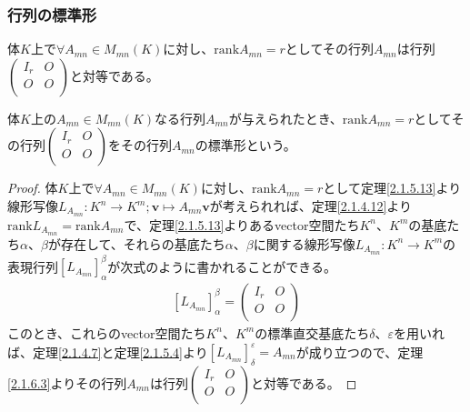 \documentclass[dvipdfmx]{jsarticle}
\begin{document}
\subsubsection{行列の標準形}%
\begin{thm}[行列の標準形]\label{2.1.6.6}
体$K$上で$\forall A_{mn} \in M_{mn}(K)$に対し、${\mathrm{rank}}A_{mn} = r$としてその行列$A_{mn}$は行列$\begin{pmatrix}
I_{r} & O \\
O & O \\
\end{pmatrix}$と対等である。
\end{thm}
\begin{dfn}
体$K$上の$A_{mn} \in M_{mn}(K)$なる行列$A_{mn}$が与えられたとき、${\mathrm{rank}}A_{mn} = r$としてその行列$\begin{pmatrix}
I_{r} & O \\
O & O \\
\end{pmatrix}$をその行列$A_{mn}$の標準形という。
\end{dfn}
\begin{proof}
体$K$上で$\forall A_{mn} \in M_{mn}(K)$に対し、${\mathrm{rank}}A_{mn} = r$として定理\ref{2.1.5.13}より線形写像$L_{A_{mn}}:K^{n} \rightarrow K^{m};\mathbf{v} \mapsto A_{mn}\mathbf{v}$が考えられれば、定理\ref{2.1.4.12}より${\mathrm{rank}}L_{A_{mn}} = {\mathrm{rank}}A_{mn}$で、定理\ref{2.1.5.13}よりあるvector空間たち$K^{n}$、$K^{m}$の基底たち$\alpha$、$\beta$が存在して、それらの基底たち$\alpha 、\beta$に関する線形写像$L_{A_{mn}}:K^{n} \rightarrow K^{m}$の表現行列$\left[ L_{A_{mn}} \right]^{\beta}_{\alpha}$が次式のように書かれることができる。
\begin{align*}
\left[ L_{A_{mn}} \right]^{\beta}_{\alpha} = \begin{pmatrix}
I_{r} & O \\
O & O \\
\end{pmatrix}
\end{align*}
このとき、これらのvector空間たち$K^{n}$、$K^{m}$の標準直交基底たち$\delta$、$\varepsilon$を用いれば、定理\ref{2.1.4.7}と定理\ref{2.1.5.4}より$\left[ L_{A_{mn}} \right]^{\varepsilon}_{\delta} = A_{mn}$が成り立つので、定理\ref{2.1.6.3}よりその行列$A_{mn}$は行列$\begin{pmatrix}
I_{r} & O \\
O & O \\
\end{pmatrix}$と対等である。
\end{proof}
\end{document}
